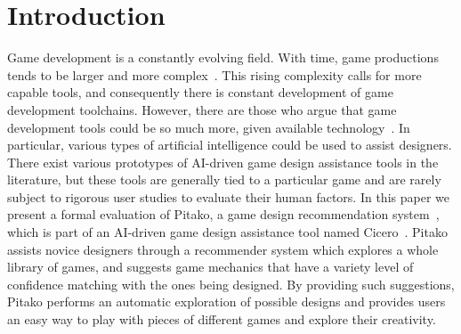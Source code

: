\documentclass[letterpaper]{article} %
\begin{document}
\section{Introduction}
Game development is a constantly evolving field. With time, game productions tends to be larger and more complex~\cite{Blow:2004:GDH:971564.971590}.
This rising complexity calls for more capable tools, and consequently there is constant development of game development toolchains.
However, there are those who argue that game development tools could be so much more, given available technology~\cite{Kasurinen:2013:GDE:2460999.2461004}.
In particular, various types of artificial intelligence could be used to assist designers. There exist various prototypes of AI-driven game design assistance tools in the literature, but these tools are generally tied to a particular game and are rarely subject to rigorous user studies to evaluate their human factors.
In this paper we present a formal evaluation of Pitako, a game design recommendation system~\cite{machado2019pitako}, which is part of an AI-driven game design assistance tool named Cicero~\cite{Machado2018AIAssistedGD}. Pitako assists novice designers through a recommender system which explores a whole library of games, and suggests game mechanics that have a variety level of confidence matching with the ones being designed. By providing such suggestions, Pitako performs an automatic exploration of possible designs and provides users an easy way to play with pieces of different games and explore their creativity\cite{Shneiderman:2007:CST:1323688.1323689}. %
\end{document}
